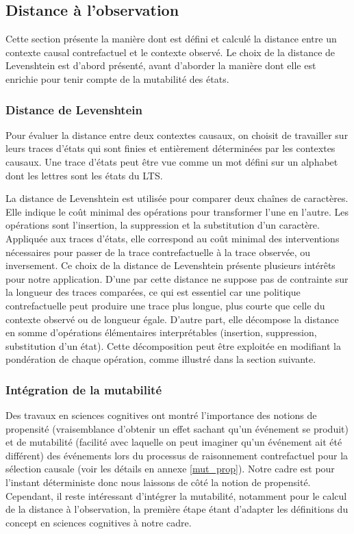 \subsection{Distance à l'observation} \label{dist_obs}

Cette section présente la manière dont est défini et calculé la distance entre un contexte causal contrefactuel et le contexte observé. Le choix de la distance de Levenshtein est d'abord présenté, avant d'aborder la manière dont elle est enrichie pour tenir compte de la mutabilité des états.


\subsubsection{Distance de Levenshtein}

Pour évaluer la distance entre deux contextes causaux, on choisit de travailler sur leurs traces d'états qui sont finies et entièrement déterminées par les contextes causaux. Une trace d'états peut être vue comme un mot défini sur un alphabet dont les lettres sont les états du LTS.

La distance de Levenshtein est utilisée pour comparer deux chaînes de caractères. Elle indique le coût minimal des opérations pour transformer l'une en l'autre. Les opérations sont l'insertion, la suppression et la substitution d'un caractère. Appliquée aux traces d'états, elle correspond au coût minimal des interventions nécessaires pour passer de la trace contrefactuelle à la trace observée, ou inversement. Ce choix de la distance de Levenshtein présente plusieurs intérêts pour notre application. D'une par cette distance ne suppose pas de contrainte sur la longueur des traces comparées, ce qui est essentiel car une politique contrefactuelle peut produire une trace plus longue, plus courte que celle du contexte observé ou de longueur égale. D'autre part, elle décompose la distance en somme d'opérations élémentaires interprétables (insertion, suppression, substitution d'un état). Cette décomposition peut être exploitée en modifiant la pondération de chaque opération, comme illustré dans la section suivante.


\subsubsection{Intégration de la mutabilité}

Des travaux en sciences cognitives ont montré l'importance des notions de propensité (vraisemblance d'obtenir un effet sachant qu'un événement se produit) et de mutabilité (facilité avec laquelle on peut imaginer qu'un événement ait été différent) des événements lors du processus de raisonnement contrefactuel pour la sélection causale \parencite{mcgill_mutability_2000} (voir les détails en annexe \ref{mut_prop}). Notre cadre est pour l'instant déterministe donc nous laissons de côté la notion de propensité. Cependant, il reste intéressant d'intégrer la mutabilité, notamment pour le calcul de la distance à l'observation, la première étape étant d'adapter les définitions du concept en sciences cognitives à notre cadre. 

